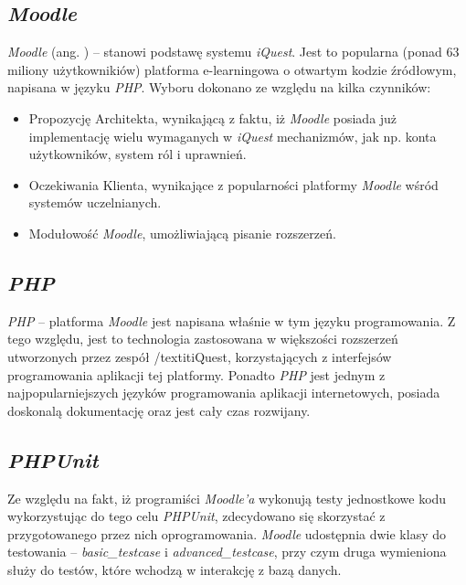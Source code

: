\subsection{\textit{Moodle}}
\label{Chapter631}

\textit{Moodle} (ang. ) -- stanowi podstawę systemu \textit{iQuest}. Jest to popularna (ponad 63 miliony użytkownikiów) platforma e-learningowa o otwartym kodzie źródłowym, napisana w języku \emph{PHP}. Wyboru dokonano ze względu na kilka czynników:
\begin{itemize}
\item{Propozycję Architekta, wynikającą z faktu, iż \textit{Moodle} posiada już implementację wielu wymaganych w \textit{iQuest} mechanizmów, jak np. konta użytkowników, system ról i uprawnień.}
\item{Oczekiwania Klienta, wynikające z popularności platformy \textit{Moodle} wśród systemów uczelnianych.}
\item{Modułowość \textit{Moodle}, umożliwiającą pisanie rozszerzeń.}
\end{itemize}

\subsection{\textit{PHP}}
\label{Chapter632}

\textit{PHP} -- platforma \textit{Moodle} jest napisana właśnie w tym języku programowania. Z tego względu, jest to technologia zastosowana w większości rozszerzeń utworzonych przez zespół /textit{iQuest}, korzystających z interfejsów programowania aplikacji tej platformy. Ponadto \textit{PHP} jest jednym z najpopularniejszych języków programowania aplikacji internetowych, posiada doskonalą dokumentację oraz jest cały czas rozwijany.

\subsection{\textit{PHPUnit}}
\label{Chapter633}

Ze względu na fakt, iż programiści \textit{Moodle'a} wykonują testy jednostkowe kodu wykorzystując do tego celu \textit{PHPUnit}, zdecydowano się skorzystać z przygotowanego przez nich oprogramowania. \textit{Moodle} udostępnia dwie klasy do testowania -- \textit{basic\_testcase} i \textit{advanced\_testcase}, przy czym druga wymieniona służy do testów, które wchodzą w interakcję z bazą danych.

